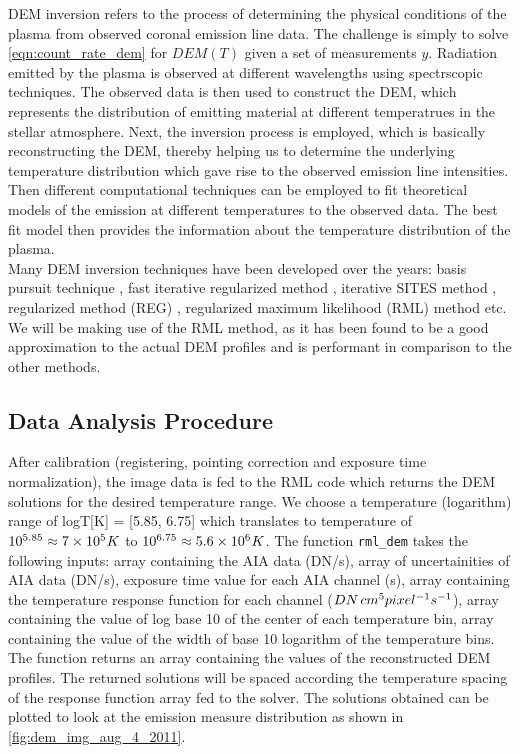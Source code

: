 DEM inversion refers to the process of determining the physical conditions of the plasma from observed coronal emission line data. The challenge is simply to solve \cref{eqn:count_rate_dem} for $DEM(T)$ given a set of measurements $y$. Radiation emitted by the plasma is observed at different wavelengths using spectrscopic techniques. The observed data is then used to construct the DEM, which represents the distribution of emitting material at different temperatrues in the stellar atmosphere. Next, the inversion process is employed, which is basically reconstructing the DEM, thereby helping us to determine the underlying temperature distribution which gave rise to the observed emission line intensities. Then different computational techniques can be employed to fit theoretical models of the emission at different temperatures to the observed data. The best fit model then provides the information about the temperature distribution of the plasma.\\

Many DEM inversion techniques have been developed over the years: basis pursuit technique \citep{Cheung2015}, fast iterative regularized method \citep{Plowman2013}, iterative SITES method \citep{Morgan2019}, regularized method (REG) \citep{Hannah2012}, regularized maximum likelihood (RML) method \citep{Massa2023} etc. We will be making use of the RML method, as it has been found to be a good approximation to the actual DEM profiles and is performant in comparison to the other methods.

\subsection{Data Analysis Procedure}
\label{sec:data_analysis_procedure}

After calibration (registering, pointing correction and exposure time normalization), the image data is fed to the RML code {\citep{Massa2023}} which returns the DEM solutions for the desired temperature range. We choose a temperature (logarithm) range of logT[K] = [5.85, 6.75] which translates to temperature of $10^{5.85} \approx 7 \times 10^5 \hspace{0.1mm} K$ to $10^{6.75} \approx 5.6 \times 10^6 \hspace{0.1mm} K$. The function \texttt{rml\_dem} takes the following inputs: array containing the AIA data (DN/s), array of uncertainities of AIA data (DN/s), exposure time value for each AIA channel (s), array containing the temperature response function for each channel ($ DN \hspace{0.5mm} cm^5 pixel^{-1} s^{-1}$), array containing the value of log base 10 of the center of each temperature bin, array containing the value of the width of base 10 logarithm of the temperature bins. The function returns an array containing the values of the reconstructed DEM profiles. The returned solutions will be spaced according the temperature spacing of the response function array fed to the solver. The solutions obtained can be plotted to look at the emission measure distribution as shown in \cref{fig:dem_img_aug_4_2011}.\\


